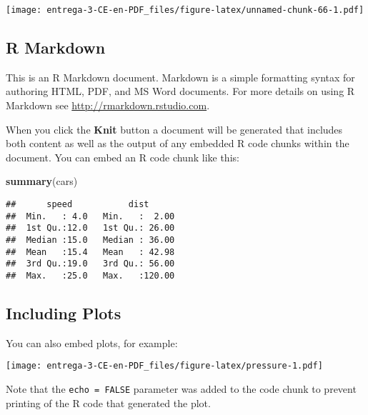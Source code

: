 \documentclass[
]{article}
\newenvironment{Shaded}{\begin{snugshade}}{\end{snugshade}}
\newcommand{\KeywordTok}[1]{\textcolor[rgb]{0.13,0.29,0.53}{\textbf{#1}}}
\newcommand{\NormalTok}[1]{#1}
\begin{document}
\texttt{[image: entrega-3-CE-en-PDF\_files/figure-latex/unnamed-chunk-66-1.pdf]}

\hypertarget{r-markdown}{%
\subsection{R Markdown}\label{r-markdown}}

This is an R Markdown document. Markdown is a simple formatting syntax
for authoring HTML, PDF, and MS Word documents. For more details on
using R Markdown see \url{http://rmarkdown.rstudio.com}.

When you click the \textbf{Knit} button a document will be generated
that includes both content as well as the output of any embedded R code
chunks within the document. You can embed an R code chunk like this:

\begin{Shaded}
\begin{Highlighting}[]
\KeywordTok{summary}\NormalTok{(cars)}
\end{Highlighting}
\end{Shaded}

\begin{verbatim}
##      speed           dist       
##  Min.   : 4.0   Min.   :  2.00  
##  1st Qu.:12.0   1st Qu.: 26.00  
##  Median :15.0   Median : 36.00  
##  Mean   :15.4   Mean   : 42.98  
##  3rd Qu.:19.0   3rd Qu.: 56.00  
##  Max.   :25.0   Max.   :120.00
\end{verbatim}

\hypertarget{including-plots}{%
\subsection{Including Plots}\label{including-plots}}

You can also embed plots, for example:

\texttt{[image: entrega-3-CE-en-PDF\_files/figure-latex/pressure-1.pdf]}

Note that the \texttt{echo\ =\ FALSE} parameter was added to the code
chunk to prevent printing of the R code that generated the plot.
\end{document}
